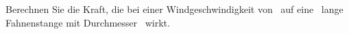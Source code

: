 Berechnen Sie die Kraft, die bei einer Windgeschwindigkeit von \vWiO\ auf eine \lFaO\ lange Fahnenstange mit Durchmesser \dFaO\ wirkt.
